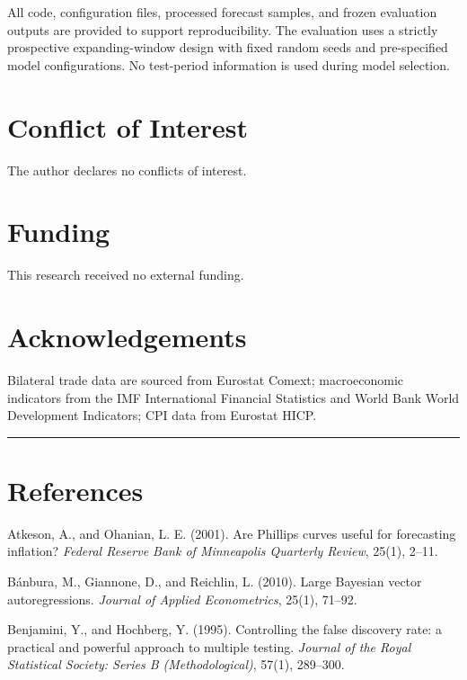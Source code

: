 \documentclass[
]{article}
\newcounter{none} %
\begin{document}
All code, configuration files, processed forecast samples, and frozen evaluation outputs are provided to support reproducibility. The evaluation uses a strictly prospective expanding-window design with fixed random seeds and pre-specified model configurations. No test-period information is used during model selection.

\section{Conflict of Interest}\label{conflict-of-interest}

The author declares no conflicts of interest.

\section{Funding}\label{funding}

This research received no external funding.

\section{Acknowledgements}\label{acknowledgements}

Bilateral trade data are sourced from Eurostat Comext; macroeconomic
indicators from the IMF International Financial Statistics and World
Bank World Development Indicators; CPI data from Eurostat HICP.

\begin{center}\rule{0.5\linewidth}{0.5pt}\end{center}

\section{References}\label{references}

Atkeson, A., and Ohanian, L. E. (2001). Are Phillips curves useful for
forecasting inflation? \emph{Federal Reserve Bank of Minneapolis
Quarterly Review}, 25(1), 2--11.

B\'{a}nbura, M., Giannone, D., and Reichlin, L. (2010). Large Bayesian
vector autoregressions. \emph{Journal of Applied Econometrics}, 25(1),
71--92.

Benjamini, Y., and Hochberg, Y. (1995). Controlling the false discovery
rate: a practical and powerful approach to multiple testing.
\emph{Journal of the Royal Statistical Society: Series B
(Methodological)}, 57(1), 289--300.
\end{document}
